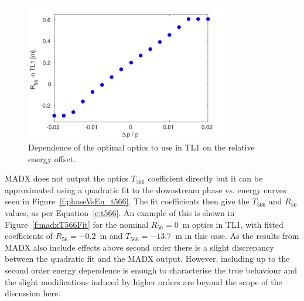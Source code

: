 \begin{figure}
  \centering
  \includegraphics[width=0.8\textwidth]{Figures/propagation/optR56vsEnergy}
  \caption{Dependence of the optimal optics to use in TL1 on the relative energy offset.}
  \label{f:optR56vsEnergy}
\end{figure}


MADX does not output the optics \(T_{566}\) coefficient directly but it can be approximated using a quadratic fit to the downstream phase vs. energy curves seen in Figure~\ref{f:phaseVsEn_t566}. The fit coefficients then give the \(T_{566}\) and \(R_{56}\) values, as per Equation~\ref{e:t566}. An example of this is shown in Figure~\ref{f:madxT566Fit} for the nominal \(R_{56}=0\)~m optics in TL1, with fitted coefficients of \(R_{56}=-0.2\)~m and \(T_{566}=-13.7\)~m in this case. As the results from MADX also include effects above second order there is a slight discrepancy between the quadratic fit and the MADX output. However, including up to the second order energy dependence is enough to characterise the true behaviour and the slight modifications induced by higher orders are beyond the scope of the discussion here.


